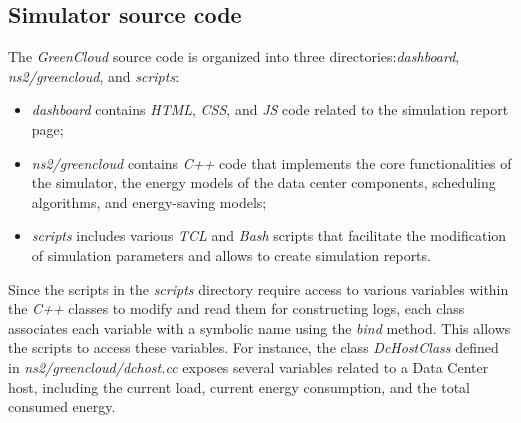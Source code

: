 \subsection{Simulator source code} \label{subsection:greencloud_code}
The \emph{GreenCloud} source code is organized into three directories:\emph{dashboard}, \emph{ns2/greencloud}, and \emph{scripts}:
\begin{itemize}
\item \emph{dashboard} contains \emph{HTML}, \emph{CSS}, and \emph{JS} code related to the simulation report page;
\item \emph{ns2/greencloud} contains \emph{C++} code that implements the core functionalities of the simulator, the energy models of the data center components, scheduling algorithms, and energy-saving models;
\item \emph{scripts} includes various \emph{TCL} and \emph{Bash} scripts that facilitate the modification of simulation parameters and allows to create simulation reports.
\end{itemize}
Since the scripts in the \emph{scripts} directory require access to various variables within the \emph{C++} classes to modify and read them for constructing logs, each class associates each variable with a symbolic name using the \emph{bind} method. This allows the scripts to access these variables.
For instance, the class \emph{DcHostClass} defined in \emph{ns2/greencloud/dchost.cc} exposes several variables related to a Data Center host, including the current load, current energy consumption, and the total consumed energy.

